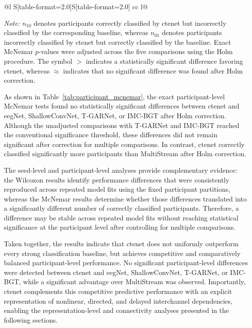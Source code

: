 \begin{table}[H]
\begin{threeparttable}
\begin{tabular*}{\textwidth}{@{\extracolsep{\fill}}l
    S[table-format=2.0]S[table-format=2.0]
    cc l@{}}
\bottomrule
\end{tabular*}

\begin{tablenotes}[flushleft]
\footnotesize
\item \textit{Note:} $n_{10}$ denotes participants correctly classified by
\gls{ctenet} but incorrectly classified by the corresponding baseline, whereas
$n_{01}$ denotes participants incorrectly classified by \gls{ctenet} but correctly
classified by the baseline. Exact McNemar $p$-values were adjusted across the
five comparisons using the Holm procedure. The symbol $>$ indicates a
statistically significant difference favoring \gls{ctenet}, whereas $\approx$
indicates that no significant difference was found after Holm correction.
\end{tablenotes}
\end{threeparttable}
\end{table}

{As shown in Table~\ref{tab:participant_mcnemar}, the exact participant-level McNemar tests found no statistically significant differences between \gls{ctenet} and \gls{eeg}Net, ShallowConvNet, T-GARNet, or IMC-BGT after Holm correction. Although the unadjusted comparisons with T-GARNet and IMC-BGT reached the conventional significance threshold, these differences did not remain significant after correction for multiple comparisons. In contrast, \gls{ctenet} correctly classified significantly more participants than MultiStream after Holm correction.}

{The seed-level and participant-level analyses provide complementary evidence: the Wilcoxon results identify performance differences that were consistently reproduced across repeated model fits using the fixed participant partitions, whereas the McNemar results determine whether those differences translated into a significantly different number of correctly classified participants. Therefore, a difference may be stable across repeated model fits
without reaching statistical significance at the participant level after controlling for multiple comparisons.}

{Taken together, the results indicate that \gls{ctenet} does not uniformly outperform every strong classification baseline, but achieves competitive and comparatively balanced participant-level performance. No significant participant-level differences were detected between \gls{ctenet} and \gls{eeg}Net, ShallowConvNet, T-GARNet, or IMC-BGT, while a significant advantage over MultiStream was observed. Importantly, \gls{ctenet} complements this competitive predictive performance with an explicit representation of nonlinear, directed, and delayed interchannel dependencies, enabling the representation-level and connectivity analyses presented in the following sections.}


